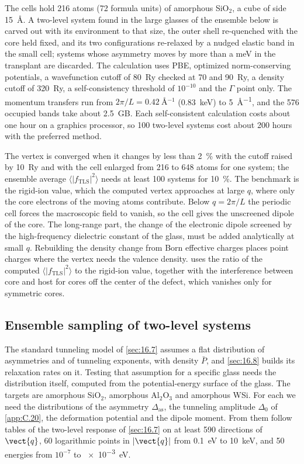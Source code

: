 The cells hold 216 atoms (72 formula units) of amorphous SiO$_2$, a cube of side \SI{15}{\angstrom}. A two-level system found in the large glasses of the ensemble below is carved out with its environment to that size, the outer shell re-quenched with the core held fixed, and its two configurations re-relaxed by a nudged elastic band in the small cell; systems whose asymmetry moves by more than a meV in the transplant are discarded. The calculation uses PBE, optimized norm-conserving potentials, a wavefunction cutoff of \SI{80}{Ry} checked at 70 and \SI{90}{Ry}, a density cutoff of \SI{320}{Ry}, a self-consistency threshold of $10^{-10}$ and the $\Gamma$ point only. The momentum transfers run from $2\pi/L = \SI{0.42}{\angstrom^{-1}}$ (\SI{0.83}{keV}) to \SI{5}{\angstrom^{-1}}, and the 576 occupied bands take about \SI{2.5}{GB}. Each self-consistent calculation costs about one hour on a graphics processor, so 100 two-level systems cost about 200 hours with the preferred method.

The vertex is converged when it changes by less than \SI{2}{\percent} with the cutoff raised by \SI{10}{Ry} and with the cell enlarged from 216 to 648 atoms for one system; the ensemble average $\langle|f_{\mathrm{TLS}}|^2\rangle$ needs at least 100 systems for \SI{10}{\percent}. The benchmark is the rigid-ion value, which the computed vertex approaches at large $q$, where only the core electrons of the moving atoms contribute. Below $q = 2\pi/L$ the periodic cell forces the macroscopic field to vanish, so the cell gives the unscreened dipole of the core. The long-range part, the change of the electronic dipole screened by the high-frequency dielectric constant of the glass, must be added analytically at small $q$. Rebuilding the density change from Born effective charges places point charges where the vertex needs the valence density.  uses the ratio of the computed $\langle|f_{\mathrm{TLS}}|^2\rangle$ to the rigid-ion value, together with the interference between core and host for cores off the center of the defect, which vanishes only for symmetric cores.

\subsection{Ensemble sampling of two-level systems}

The standard tunneling model of \cref{sec:16.7} assumes a flat distribution of asymmetries and of tunneling exponents, with density $\bar P$, and \cref{sec:16.8} builds its relaxation rates on it. Testing that assumption for a specific glass needs the distribution itself, computed from the potential-energy surface of the glass. The targets are amorphous SiO$_2$, amorphous Al$_2$O$_3$ and amorphous WSi. For each we need the distributions of the asymmetry $\Delta_{\mathrm{as}}$, the tunneling amplitude $\Delta_0$ of \cref{app:C.20}, the deformation potential and the dipole moment. From them follow tables of the two-level response of \cref{sec:16.7} on at least 590 directions of $\vect{q}$, 60 logarithmic points in $|\vect{q}|$ from \SI{0.1}{eV} to \SI{10}{keV}, and 50 energies from $10^{-7}$ to \SI{e-3}{eV}.

